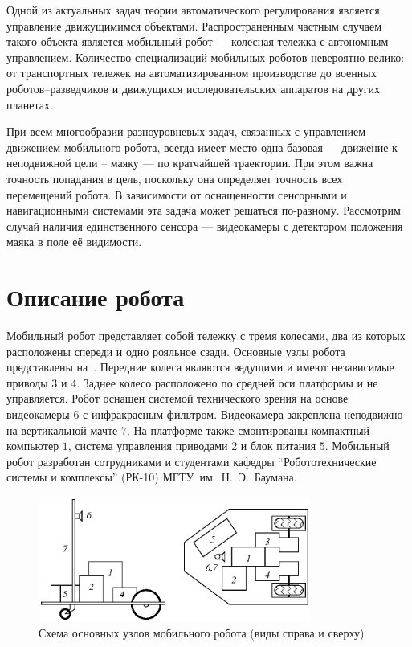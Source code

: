 
Одной из актуальных задач теории автоматического регулирования
является управление движущимимся объектами.  Распространенным частным
случаем такого объекта является мобильный робот --- колесная тележка с
автономным управлением.  Количество специализаций мобильных роботов
невероятно велико: от транспортных тележек на автоматизированном
производстве до военных роботов--разведчиков и движущихся
исследовательских аппаратов на других планетах.

При всем многообразии разноуровневых задач, связанных с управлением
движением мобильного робота, всегда имеет место одна базовая ---
движение к неподвижной цели -- маяку --- по кратчайшей траектории.
При этом важна точность попадания в цель, поскольку она определяет
точность всех перемещений робота.  В зависимости от оснащенности
сенсорными и навигационными системами эта задача может решаться
по-разному.  Рассмотрим случай наличия единственного сенсора ---
видеокамеры с детектором положения маяка в поле её видимости.

\section{Описание робота}

Мобильный робот представляет собой тележку с тремя колесами, два из
которых расположены спереди и одно рояльное сзади.  Основные узлы
робота представлены на~.  Передние колеса
являются ведущими и имеют независимые приводы $3$ и $4$.  Заднее
колесо расположено по средней оси платформы и не управляется.  Робот
оснащен системой технического зрения на основе видеокамеры $6$ с
инфракрасным фильтром.  Видеокамера закреплена неподвижно на
вертикальной мачте $7$.  На платформе также смонтированы компактный
компьютер $1$, система управления приводами $2$ и блок питания $5$.
Мобильный робот разработан сотрудниками и студентами кафедры
``Робототехнические системы и комплексы'' (РК-10)
МГТУ~им.~Н.~Э.~Баумана.

\begin{figure}[h]
\centerline{\includegraphics[width=0.8\textwidth]{moby_projections}}
\caption{Схема основных узлов мобильного робота (виды справа и сверху)}%
\label{fig:moby_projections}
\end{figure}

